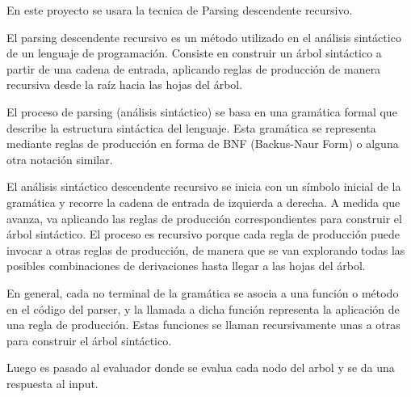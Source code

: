\documentclass[a4paper, 12pt]{report}
\begin{document}
En este proyecto se usara la tecnica de Parsing descendente recursivo.

El parsing descendente recursivo es un método utilizado en el análisis sintáctico de un lenguaje de programación. Consiste en construir un árbol sintáctico a partir de una cadena de entrada, aplicando reglas de producción de manera recursiva desde la raíz hacia las hojas del árbol.

El proceso de parsing (análisis sintáctico) se basa en una gramática formal que describe la estructura sintáctica del lenguaje. Esta gramática se representa mediante reglas de producción en forma de BNF (Backus-Naur Form) o alguna otra notación similar.

El análisis sintáctico descendente recursivo se inicia con un símbolo inicial de la gramática y recorre la cadena de entrada de izquierda a derecha. A medida que avanza, va aplicando las reglas de producción correspondientes para construir el árbol sintáctico. El proceso es recursivo porque cada regla de producción puede invocar a otras reglas de producción, de manera que se van explorando todas las posibles combinaciones de derivaciones hasta llegar a las hojas del árbol.

En general, cada no terminal de la gramática se asocia a una función o método en el código del parser, y la llamada a dicha función representa la aplicación de una regla de producción. Estas funciones se llaman recursivamente unas a otras para construir el árbol sintáctico.

Luego es pasado al evaluador donde se evalua cada nodo del arbol y se da una respuesta al input.
\end{document}
